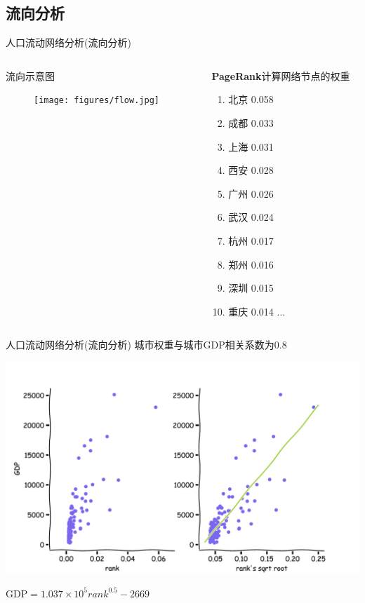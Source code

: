 \subsection{流向分析}

\begin{frame}[t]{人口流动网络分析(流向分析)}
    \begin{columns}
        \begin{column}{0.4 \textwidth}
            \alert{流向示意图}

            \begin{figure}
                \texttt{[image: figures/flow.jpg]}
            \end{figure}
        \end{column}

        \pause
        \begin{column}{0.6 \textwidth}
            \textbf{PageRank}计算网络节点的权重

            \begin{enumerate}
                \item 北京 0.058
                \item 成都 0.033
                \item 上海 0.031
                \item 西安 0.028
                \item 广州 0.026
                \item 武汉 0.024
                \item 杭州 0.017
                \item 郑州 0.016
                \item 深圳 0.015
                \item 重庆 0.014
                $\ldots$
            \end{enumerate}
        \end{column}
    \end{columns}
\end{frame}


\begin{frame}[t]{人口流动网络分析(流向分析)}
    城市权重与城市GDP相关系数为0.8

    \pause
    \includegraphics[scale=0.4]{figures/rank_gdp_scatter.pdf}

    $\text{GDP} = 1.037\times 10^5 rank^{0.5}-2669$
\end{frame}

